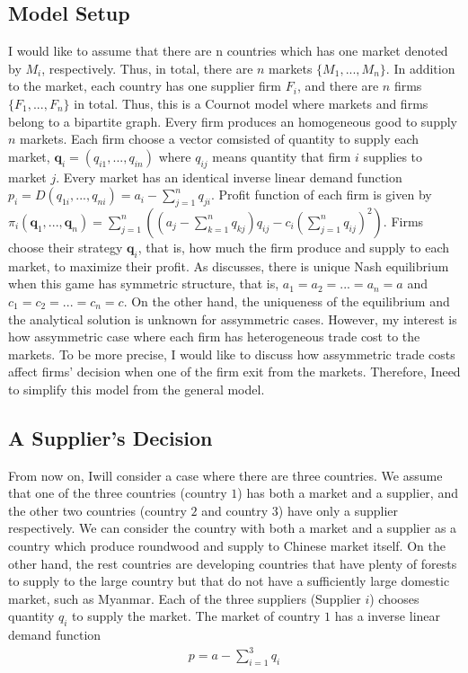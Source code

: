 \documentclass[a4paper,12pt]{article}
\begin{document}
\subsection{Model Setup}
I would like to assume that there are n countries which has one market denoted by $M_i$, respectively. Thus, in total, there are $n$ markets $\{ M_1, ..., M_n \}$. In addition to the market, each country has one supplier firm $F_i$, and there are $n$ firms $\{ F_1, ..., F_n \}$ in total. Thus, this is a Cournot model where markets and firms belong to a bipartite graph. Every firm produces an homogeneous good to supply $n$ markets. Each firm choose a vector comsisted of quantity to supply each market, $\mathbf{q}_i = (q_{i1}, ..., q_{in})$ where $q_{ij}$ means quantity that firm $i$ supplies to market $j$. Every market has an identical inverse linear demand function $p_i = D(q_{1i}, ..., q_{ni}) = a_i - \sum_{j=1}^n q_{ji}$. Profit function of each firm is given by $\pi_i (\mathbf{q}_1, ..., \mathbf{q}_n) = \sum_{j = 1}^{n} ((a_j - \sum_{k=1}^n q_{kj}) q_{ij} - c_{i} (\sum_{j = 1}^{n} q_{ij} ) ^ 2 )$. Firms choose their strategy $\mathbf{q}_i$, that is, how much the firm produce and supply to each market, to maximize their profit. As \cite{bimpikis2019cournot} discusses, there is unique Nash equilibrium when this game has symmetric structure, that is, $a_1 = a_2 = ... = a_n = a$ and $c_1 = c_2 = ... = c_n = c$. On the other hand, the uniqueness of the equilibrium and the analytical solution is unknown for assymmetric cases. However, my interest is how assymmetric case where each firm has heterogeneous trade cost to the markets. To be more precise, I would like to discuss how assymmetric trade costs affect firms' decision when one of the firm exit from the markets. Therefore, Ineed to simplify this model from the general model. \\

\subsection{A Supplier's Decision}
From now on, Iwill consider a case where there are three countries. We assume that one of the three countries (country $1$) has both a market and a supplier, and the other two countries (country $2$ and country $3$) have only a supplier respectively. We can consider the country with both a market and a supplier as a country which produce roundwood and supply to Chinese market itself. On the other hand, the rest countries are developing countries that have plenty of forests to supply to the large country but that do not have a sufficiently large domestic market, such as Myanmar. Each of the three suppliers (Supplier $i$) chooses quantity $q_i$ to supply the market. The market of country $1$ has a inverse linear demand function
\begin{align}
    p = a - \sum_{i=1}^3 q_i
\end{align}
\end{document}
